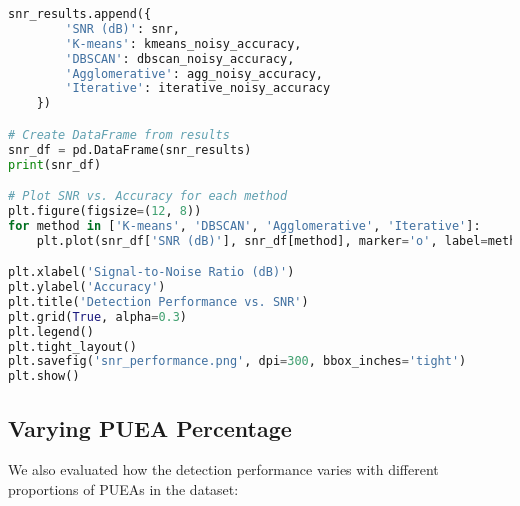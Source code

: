 \begin{lstlisting}[language=Python, caption=SNR Experiment Implementation]
    snr_results.append({
        'SNR (dB)': snr,
        'K-means': kmeans_noisy_accuracy,
        'DBSCAN': dbscan_noisy_accuracy,
        'Agglomerative': agg_noisy_accuracy,
        'Iterative': iterative_noisy_accuracy
    })

# Create DataFrame from results
snr_df = pd.DataFrame(snr_results)
print(snr_df)

# Plot SNR vs. Accuracy for each method
plt.figure(figsize=(12, 8))
for method in ['K-means', 'DBSCAN', 'Agglomerative', 'Iterative']:
    plt.plot(snr_df['SNR (dB)'], snr_df[method], marker='o', label=method)

plt.xlabel('Signal-to-Noise Ratio (dB)')
plt.ylabel('Accuracy')
plt.title('Detection Performance vs. SNR')
plt.grid(True, alpha=0.3)
plt.legend()
plt.tight_layout()
plt.savefig('snr_performance.png', dpi=300, bbox_inches='tight')
plt.show()
\end{lstlisting}

\subsection{Varying PUEA Percentage}
We also evaluated how the detection performance varies with different proportions of PUEAs in the dataset:

